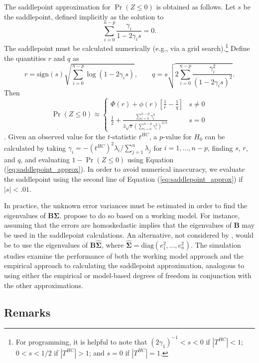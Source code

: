 \documentclass[12pt]{article}\usepackage[]{graphicx}\usepackage[]{color}
\newcommand{\diag}{\text{diag}}
\newcommand{\bm}{\mathbf}
\newcommand{\bs}{\boldsymbol}
\begin{document}
The saddlepoint approximation for $\Pr(Z \leq 0)$ is obtained as follows. Let $s$ be the saddlepoint, defined implicitly as the solution to \[
\sum_{i=0}^{n-p} \frac{\gamma_i}{1 - 2 \gamma_i s} = 0. \]
The saddlepoint must be calculated numerically (e.g., via a grid search).\footnote{For programming, it is helpful to note that $(2 \gamma_1)^{-1} < s < 0$ if $|T^{HC}| < 1$; $0 < s < 1/2$ if $|T^{HC}| > 1$; and $s = 0$ if $|T^{HC}| = 1$.} 
Define the quantities $r$ and $q$ as \[
r = \text{sign}(s)\sqrt{\sum_{i=0}^{n-p} \log\left(1 - 2\gamma_i s\right)}, \qquad q = s \sqrt{2 \sum_{i=0}^{n-p} \frac{\gamma_i^2}{\left(1 - 2 \gamma_i s\right)^2}}. \]
Then 
\begin{equation}
\label{eq:saddlepoint_approx}
\Pr(Z \leq 0) \approx \begin{cases}\displaystyle{\Phi(r) + \phi(r)\left[\frac{1}{r} - \frac{1}{q}\right]} & s \neq 0 \\
\displaystyle{\frac{1}{2} + \frac{\sum_{i=0}^{n - p} \gamma_i^3}{3 \sqrt\pi \left(\sum_{i=0}^{n - p} \gamma_i^2\right)^{3/2}}} & s = 0 \end{cases}
\end{equation}
\citep{Lugannani1980saddlepoint}.
Given an observed value for the $t$-statistic $t^{HC}$, a $p$-value for $H_0$ can be calculated by taking $\gamma_i = -\left(t^{HC}\right)^2 \lambda_i / \sum_{j=1}^n \lambda_j$ for $i = 1,...,n - p$, finding $s$, $r$, and $q$, and evaluating $1 - \Pr(Z \leq 0)$ using Equation (\ref{eq:saddlepoint_approx}). In order to avoid numerical inaccuracy, we evaluate the saddlepoint using the second line of Equation (\ref{eq:saddlepoint_approx}) if $|s| < .01$.

In practice, the unknown error variances must be estimated in order to find the eigenvalues of $\bm{B}\bs\Sigma$. 
\citet{McCaffrey2006improved} propose to do so based on a working model. 
For instance, assuming that the errors are homoskedastic implies that the eigenvalues of $\bm{B}$ may be used in the saddlepoint calculations. 
An alternative, not considered by \citet{McCaffrey2006improved}, would be to use the eigenvalues of $\bm{B}\bs{\hat\Sigma}$, where $\bs{\hat\Sigma} = \diag\left(e_1^2,...,e_n^2\right)$.
The simulation studies examine the performance of both the working model approach and the empirical approach to calculating the saddlepoint approximation, analogous to using either the empirical or model-based degrees of freedom in conjunction with the other approximations. 

\subsection{Remarks}
\end{document}
